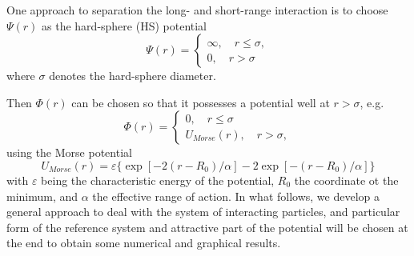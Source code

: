 One approach to separation the long- and short-range interaction is to choose $\Psi(r)$ as the hard-sphere (HS) potential
\begin{equation}
	\Psi(r) = 
	\left\{
	\begin{array}{cc}
		\infty, \quad r\leq \sigma, \\
		0, \quad r > \sigma
	\end{array}
	\right.
\end{equation}
where $\sigma$ denotes the hard-sphere diameter.

Then $\Phi(r)$ can be chosen so that it possesses a potential well at $r > \sigma$, e.g.
\begin{equation}
	\label{short-range-potential}
	\Phi(r) = \left\{
	\begin{array}{cc}
		0, \quad r \leq \sigma \\
		U_{Morse}(r), \quad r > \sigma,
	\end{array}
	\right.
\end{equation}
using the Morse potential
\begin{equation}
	U_{Morse}(r) = \varepsilon \{\exp{[-2(r-R_0)/\alpha]}-2\exp{[-(r-R_0)/\alpha]}\}
\end{equation}
with $\varepsilon$ being the characteristic energy of the potential, $R_0$ the coordinate ot the minimum, and $\alpha$ the effective range of action.
In what follows, we develop a general approach to deal with the system of interacting particles, and particular form of the reference system and attractive part of the potential will be chosen at the end to obtain some numerical and graphical results.

